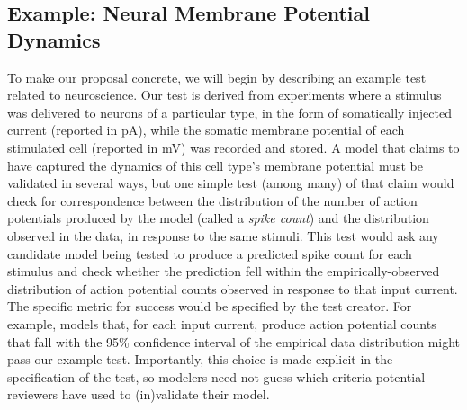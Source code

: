 \documentclass[11pt,letterpaper]{article}
\begin{document}
\subsection{Example: Neural Membrane Potential Dynamics} To make our proposal concrete, we will begin by describing an example test related to  neuroscience. Our test is derived from experiments where a stimulus was delivered to neurons of a particular type, in the form of somatically injected current (reported in pA), while the somatic membrane potential of each stimulated cell (reported in mV) was recorded and stored.  A model that claims to have captured the dynamics of this cell type's membrane potential must be validated in several ways, but one simple test (among many) of that claim would check for correspondence between the distribution of the number of action potentials produced by the model (called a \emph{spike count}) and the distribution observed in the data, in response to the same stimuli. This test would ask any candidate model being tested to produce a predicted spike count for each stimulus and check whether the prediction fell within the empirically-observed distribution of action potential counts observed in response to that input current.  The specific metric for success would be specified by the test creator.  For example, models that, for each input current, produce action potential counts that fall with the 95\% confidence interval of the empirical data distribution might pass our example test. Importantly, this choice is made explicit in the specification of the test, so modelers need not guess which criteria potential reviewers have used to (in)validate their model.
\end{document}
